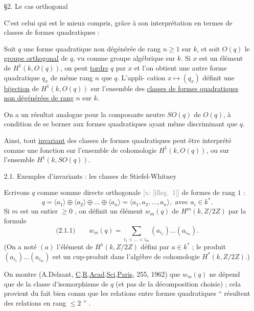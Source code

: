 \documentclass[11pt]{article}
\newcommand{\scanpage}[1]{\par\bigskip\noindent{\small\sffamily[scan #1]}\par}
\newcommand{\mspage}[1]{{\small\sffamily[p.\,#1]}}
\newcommand{\hand}[1]{\textcolor{blue}{#1}}
\newcommand{\xout}[1]{\textcolor{gray}{[\textsf{x:} #1]}}
\newcommand{\uline}[1]{\underline{#1}}
\newcommand{\illegible}[1]{[\textsf{illeg.\ #1}]}
\begin{document}
\mspage{\hand{288}}

\clearpage
\scanpage{119/289}
\mspage{- 2 -}

§2. Le cas orthogonal

C'est celui qui est le mieux compris, grâce à son interprétation en termes
de classes de formes quadratiques :

Soit $q$ une forme quadratique non dégénérée de rang $n \geqslant 1$ sur $k$,
et soit $O(q)$ le \uline{groupe orthogonal} de $q$, vu comme groupe algébrique
sur $k$. Si $x$ est un élément de $H^1(k, O(q))$, on peut \uline{tordre} $q$ par $x$ et
l'on obtient une autre forme quadratique $q_x$ de même rang $n$ que $q$. L'appli-%
cation $x \longmapsto (q_x)$ définit une \uline{bijection} de $H^1(k, O(q))$ sur l'ensemble des
\uline{classes de formes quadratiques non dégénérées de rang} $n$ sur $k$.

On a un résultat analogue pour la composante neutre $SO(q)$ de $O(q)$, à
condition de se borner aux formes quadratiques ayant même discriminant que $q$.

Ainsi, tout \uline{invariant} des classes de formes quadratiques peut être
interprété comme une fonction sur l'ensemble de cohomologie $H^1(k, O(q))$,
ou sur l'ensemble $H^1(k, SO(q))$.

2.1. Exemples d'invariants : les classes de Stiefel-Whitney

Ecrivons $q$ comme somme directe orthogonale \xout{\illegible{1}} de formes de
rang $1$ :
\[ q = \langle a_1\rangle \oplus \langle a_2\rangle \oplus \ldots \oplus \langle a_n\rangle = \langle a_1, a_2, \ldots, a_n\rangle , \text{ avec } a_i \in k^* . \]
Si $m$ est un entier $\geqslant 0$ , on définit un élément $w_m(q)$ de $H^m(k, Z/2Z)$
par la formule
\[ \text{(2.1.1)} \qquad w_m(q) = \sum_{i_1 < \ldots < i_m} (a_{i_1})\ldots(a_{i_m}) . \]
(On a noté $(a)$ l'élément de $H^1(k, Z/2Z)$ défini par $a \in k^*$ ; le produit
$(a_{i_1})\ldots(a_{i_m})$ est un cup-produit dans l'algèbre de cohomologie $H^*(k,Z/2Z)$.)

On montre (A.Delzant, \uline{C}.\uline{R}.\uline{Acad}.\uline{Sci}.\uline{Paris}, 255, 1962) que $w_m(q)$ ne dépend
que de la classe d'isomorphisme de $q$ (et pas de la décomposition choisie) ;
cela provient du fait bien connu que les relations entre formes quadratiques
`` résultent des relations en rang $\leqslant 2$ '' .
\end{document}
